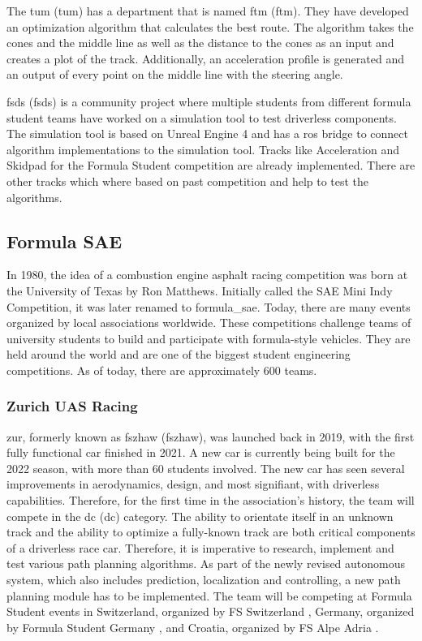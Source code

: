 The \acrshort{tum} (\acrlong{tum}) has a department that is named \acrshort{ftm} (\acrlong{ftm}). They have developed an optimization algorithm that calculates the best route. The algorithm takes the cones and the middle line as well as the distance to the cones as an input and creates a plot of the track. Additionally, an acceleration profile is generated and an output of every point on the middle line with the steering angle.
\cite{tumftm_optimization_algoritm}

\acrshort{fsds} (\acrlong{fsds}) is a community project where multiple students from different formula student teams have worked on a simulation tool to test driverless components. The simulation tool is based on Unreal Engine 4 \cite{unreal_engine} and has a \acrshort{ros} bridge to connect algorithm implementations to the simulation tool. Tracks like Acceleration and Skidpad for the Formula Student competition are already implemented. There are other tracks which where based on past competition and help to test the algorithms.
\cite{fsds_github}

\subsection{Formula SAE}
In 1980, the idea of a combustion engine asphalt racing competition was born at the University of Texas by Ron Matthews. Initially called the SAE Mini Indy Competition, it was later renamed to \Gls{formula_sae}. Today, there are many events organized by local associations worldwide.
\cite{formula_sae}
These competitions challenge teams of university students to build and participate with formula-style vehicles. They are held around the world and are one of the biggest student engineering competitions. As of today, there are approximately 600 teams. \cite{sae_student_events}

\subsubsection{Zurich UAS Racing}
\acrlong{zur}, formerly known as \acrlong{fszhaw} (\acrshort{fszhaw}), was launched back in 2019, with the first fully functional car finished in 2021. A new car is currently being built for the 2022 season, with more than 60 students involved. The new car has seen several improvements in aerodynamics, design, and most signifiant, with driverless capabilities. \cite{fszhaw_launch}
Therefore, for the first time in the association's history, the team will compete in the \acrlong{dc} (\acrshort{dc}) category.
The ability to orientate itself in an unknown track and the ability to optimize a fully-known track are both critical components of a driverless race car. Therefore, it is imperative to research, implement and test various path planning algorithms. As part of the newly revised autonomous system, which also includes prediction, localization and controlling, a new path planning module has to be implemented.
The team will be competing at Formula Student events in Switzerland, organized by FS Switzerland \cite{fsswitzerland}, Germany, organized by Formula Student Germany \cite{fs_germany}, and Croatia, organized by FS Alpe Adria \cite{fs_alpe_adria}.


